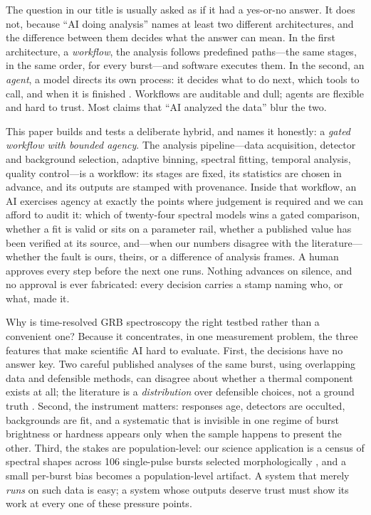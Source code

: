 \documentclass[twocolumn]{aastex631}
\begin{document}
The question in our title is usually asked as if it had a yes-or-no answer.
It does not, because ``AI doing analysis'' names at least two different
architectures, and the difference between them decides what the answer can
mean. In the first architecture, a \emph{workflow}, the analysis follows
predefined paths---the same stages, in the same order, for every burst---and
software executes them. In the second, an \emph{agent}, a model directs its
own process: it decides what to do next, which tools to call, and when it is
finished \citep{anthropic2024agents}. Workflows are auditable and dull; agents are
flexible and hard to trust. Most claims that ``AI analyzed the data'' blur
the two.

This paper builds and tests a deliberate hybrid, and names it honestly: a
\emph{gated workflow with bounded agency}. The analysis pipeline---data
acquisition, detector and background selection, adaptive binning, spectral
fitting, temporal analysis, quality control---is a workflow: its stages are
fixed, its statistics are chosen in advance, and its outputs are stamped
with provenance. Inside that workflow, an AI exercises agency at exactly the
points where judgement is required and we can afford to audit it: which of
twenty-four spectral models wins a gated comparison, whether a fit is valid
or sits on a parameter rail, whether a published value has been verified at
its source, and---when our numbers disagree with the literature---whether the
fault is ours, theirs, or a difference of analysis frames. A human approves
every step before the next one runs. Nothing advances on silence, and no
approval is ever fabricated: every decision carries a stamp naming who, or
what, made it.

Why is time-resolved GRB spectroscopy the right testbed rather than a
convenient one? Because it concentrates, in one measurement problem, the
three features that make scientific AI hard to evaluate. First, the
decisions have no answer key. Two careful published analyses of the same
burst, using overlapping data and defensible methods, can disagree about
whether a thermal component exists at all; the literature is a
\emph{distribution} over defensible choices, not a ground truth
\citep{2022ApJ...938..159S,2019ApJ...887...13F}. Second, the instrument
matters: responses age, detectors are occulted, backgrounds are fit, and a
systematic that is invisible in one regime of burst brightness or hardness
appears only when the sample happens to present the other. Third, the
stakes are population-level: our science application is a census of
spectral shapes across 106 single-pulse bursts selected morphologically
\citep{2024ApJ...972...83B}, and a small per-burst bias becomes a
population-level artifact. A system that merely \emph{runs} on such data is
easy; a system whose outputs deserve trust must show its work at every one
of these pressure points.
\end{document}
